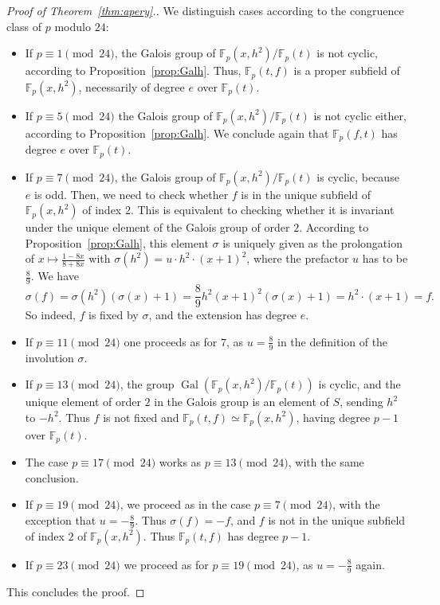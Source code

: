 \documentclass{article}
\newcommand{\F}{\mathbb{F}}
\DeclareMathOperator{\Gal}{Gal}
\theoremstyle{definition}
\theoremstyle{plain}
\theoremstyle{remark}
\begin{document}
\begin{proof}[Proof of Theorem~\ref{thm:apery}.]
    We distinguish cases according to the congruence class of $p$ modulo $24$:

    \begin{itemize}
        \item If $p\equiv 1 \pmod{24}$, the Galois group of $\F_p(x, h^2)/\F_p(t)$ is not cyclic, according to Proposition~\ref{prop:Galh}. Thus, $\F_p(t, f)$ is a proper subfield of $\F_p(x, h^2)$, necessarily of degree $e$ over $\F_p(t)$.
        \item If $p\equiv 5 \pmod{24}$ the Galois group of $\F_p(x, h^2)/\F_p(t)$ is not cyclic either, according to Proposition~\ref{prop:Galh}. We conclude again that $\F_p(f,t)$ has degree $e$ over $\F_p(t)$.
        \item If $p\equiv 7 \pmod{24}$, the Galois group of $\F_p(x, h^2)/\F_p(t)$ is cyclic, because $e$ is odd. Then, we need to check whether $f$ is in the unique subfield of $\F_p(x, h^2)$ of index 2. This is equivalent to checking whether it is invariant under the unique element  of the Galois group of order $2$. According to Proposition~\ref{prop:Galh}, this element $\sigma$ is uniquely given as the prolongation of $x\mapsto \frac{1-8x}{8+8x}$ with $\sigma(h^2)=u\cdot h^2\cdot (x+1)^2$, where the prefactor $u$ has to be $\frac89$. We have 
        \[\textstyle \sigma(f)= \sigma(h^2) (\sigma(x)+1) = \frac 8 9 h^2 (x+1)^2 (\sigma(x)+1) = h^2\cdot (x+1) = f.\]
        So indeed, $f$ is fixed by $\sigma$, and the extension has degree $e$.
        \item If $p\equiv 11 \pmod{24}$ one proceeds as for $7$, as $u=\frac 8 9$ in the definition of the involution $\sigma$.     
        \item If $p\equiv 13 \pmod{24}$, the group $\Gal(\F_p(x, h^2)/\F_p(t))$ is cyclic, and the unique element of order $2$ in the Galois group is an element of $S$, sending $h^2$ to $-h^2$. Thus $f$ is not fixed and $\F_p(t, f)\simeq \F_p(x, h^2)$, having degree $p{-}1$ over $\F_p(t)$.
        \item The case $p\equiv 17 \pmod{24}$ works as $p\equiv 13 \pmod{24}$, with the same conclusion.
        \item If $p\equiv 19 \pmod{24}$, we proceed as in the case $p\equiv 7 \pmod{24}$, with the exception that $u=-\frac 8 9$. Thus $\sigma(f)=-f$, and $f$ is not in the unique subfield of index $2$ of $\F_p(x, h^2)$. Thus $\F_p(t, f)$ has degree $p{-}1$.
        \item If $p\equiv 23 \pmod{24}$ we proceed as for $p\equiv 19 \pmod{24}$, as $u=-\frac 8 9$ again.
    \end{itemize}
This concludes the proof.
\end{proof}
\end{document}
